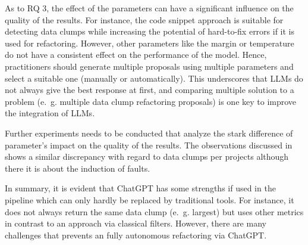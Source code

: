 As to RQ 3, the effect of the parameters can have a significant influence on the quality of the results.  For instance, the code snippet approach is suitable for detecting data clumps while increasing the potential of hard-to-fix errors if it is used for refactoring.
However, other parameters like the margin or temperature do not have a consistent effect on the performance of the model. Hence, practitioners should generate multiple proposals using multiple parameters and  select a suitable one (manually or automatically). This underscores that \acp{LLM} do not always give the best response at first, and comparing multiple solution to a problem (e.~g. multiple data clump refactoring proposals) is one key to improve the integration of \acp{LLM}. 

Further experiments needs to be conducted that analyze the stark difference of parameter's impact on the quality of the results. The observations discussed in  \cite{hallCodeSmellsHave2014} shows a similar discrepancy with regard to data clumps per projects although there it is about the induction of faults.

In summary, it is evident that ChatGPT has some strengths if used in the pipeline which can only hardly be replaced by traditional tools.   For instance, it does not always return the same data clump (e.~g. largest) but uses other metrics in contrast to an approach via classical filters. However, there are many challenges that prevents an fully autonomous refactoring via ChatGPT. 





